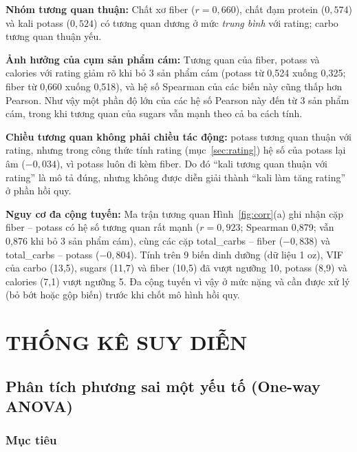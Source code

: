\documentclass[12pt,a4paper]{article}
\begin{document}
\textbf{Nhóm tương quan thuận:} Chất xơ fiber ($r = 0{,}660$), chất đạm protein
($0{,}574$) và kali potass ($0{,}524$) có tương quan dương ở mức \emph{trung bình} với rating;
carbo tương quan thuận yếu.

\textbf{Ảnh hưởng của cụm sản phẩm cám:} Tương quan của fiber, potass và calories với
rating giảm rõ khi bỏ 3 sản phẩm cám (potass từ 0,524 xuống 0,325; fiber từ 0,660 xuống
0,518), và hệ số Spearman của các biến này cũng thấp hơn Pearson. Như vậy một phần độ lớn
của các hệ số Pearson này đến từ 3 sản phẩm cám, trong khi tương quan của sugars vẫn mạnh
theo cả ba cách tính.

\textbf{Chiều tương quan không phải chiều tác động:} potass tương quan thuận với rating,
nhưng trong công thức tính rating (mục~\ref{sec:rating}) hệ số của potass lại âm
($-0{,}034$), vì potass luôn đi kèm fiber. Do đó ``kali tương quan thuận với rating'' là mô
tả đúng, nhưng không được diễn giải thành ``kali làm tăng rating'' ở phần hồi quy.

\textbf{Nguy cơ đa cộng tuyến:} Ma trận tương quan Hình~\ref{fig:corr}(a) ghi nhận cặp
fiber -- potass có hệ số tương quan rất mạnh ($r = 0{,}923$; Spearman 0,879; vẫn 0,876 khi bỏ
3 sản phẩm cám), cùng các cặp total\_carbs -- fiber ($-0{,}838$) và total\_carbs -- potass
($-0{,}804$). Tính trên 9 biến dinh dưỡng (dữ liệu 1 oz), VIF của carbo (13,5), sugars (11,7)
và fiber (10,5) đã vượt ngưỡng 10, potass (8,9) và calories (7,1) vượt ngưỡng 5. Đa cộng tuyến
vì vậy ở mức nặng và cần được xử lý (bỏ bớt hoặc gộp biến) trước khi chốt mô hình hồi quy.

\section{THỐNG KÊ SUY DIỄN}
\label{sec:suydien}
\setcounter{subsection}{2}

\subsection{Phân tích phương sai một yếu tố (One-way ANOVA)}
\label{sec:anova}

\subsubsection{Mục tiêu}
\end{document}
